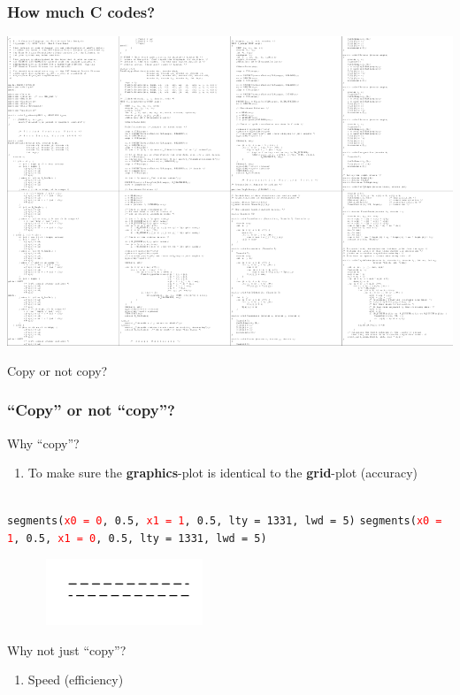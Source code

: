 \documentclass{beamer}
\begin{document}

\begin{frame}[fragile]
\frametitle{How much \textbf{C} codes?}
\begin{center}
\includegraphics{plot/code.png}
\end{center}
\end{frame}



\begin{frame}[fragile]
\begin{center}
\Huge Copy or not copy?
\end{center}
\end{frame}


\begin{frame}[fragile]
\frametitle{``Copy'' or not ``copy''?}
Why ``copy''?

\begin{enumerate}
  \item To make sure the \textbf{graphics}-plot is identical to the \textbf{grid}-plot (accuracy)\\~\\
\end{enumerate}

\texttt{segments(\textcolor{red}{x0 = 0}, 0.5, \textcolor{red}{x1 = 1}, 0.5, lty = 1331, lwd = 5)}
\texttt{segments(\textcolor{red}{x0 = 1}, 0.5, \textcolor{red}{x1 = 0}, 0.5, lty = 1331, lwd = 5)}
\begin{center}
  \includegraphics[height = 2cm, width = 7cm]{plot/Rcopy.pdf}
\end{center}


Why not just ``copy''?
\begin{enumerate}
  \item Speed (efficiency)
\end{enumerate}


\end{frame}
\end{document}
